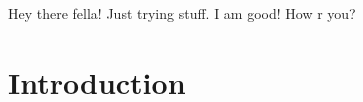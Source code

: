 \documentclass{article}
\begin{document}
Hey there fella! Just trying stuff. I am good! How r you?



\section{Introduction}
\end{document}
